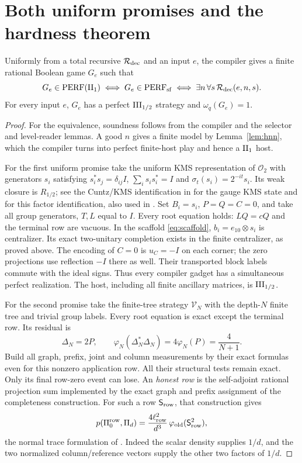 
\section{Both uniform promises and the hardness theorem}\label{sec:promises}
\begin{theoremC}
Uniformly from a total recursive $\mathcal R_{\rm dec}$ and an input $e$, the
compiler gives a finite rational Boolean game $G_e$ such that
\[
 G_e\in\mathrm{PERF}(\mathrm{II}_1)
 \iff G_e\in\mathrm{PERF}_{\mathrm{sf}}
 \iff \exists n\,\forall s\,\mathcal R_{\rm dec}(e,n,s).
\]
For every input $e$, $G_e$ has a perfect $\mathrm{III}_{1/2}$ strategy and
$\omega_q(G_e)=1$.
\end{theoremC}
\begin{proof}
For the equivalence, soundness follows from the compiler and the
selector and level-reader lemmas. A good $n$ gives a finite model
by Lemma~\ref{lem:hnn}, which the compiler turns into perfect finite-host
play and hence a $\mathrm{II}_1$ host.

For the first uniform promise take the uniform KMS representation
of $\mathcal O_2$ with generators $s_i$ satisfying
$s_i^*s_j=\delta_{ij}I$, $\sum_i s_is_i^*=I$ and
$\sigma_t(s_i)=2^{-it}s_i$.
Its weak closure is $R_{1/2}$; see the Cuntz/KMS identification in
\cite{OP} for the gauge KMS state and
\cite[Theorem 4.9 and Example 4.13]{Harris} for this factor
identification, also used in
\cite[Section 3.1]{ReadType}.
Set $B_i=s_i$, $P=Q=C=0$, and take all group generators, $T,L$ equal
to $I$. Every root equation holds: $LQ=cQ$ and the terminal row
are vacuous. In the scaffold \eqref{eq:scaffold},
$b_i=e_{10}\otimes s_i$ is centralizer.
Its exact two-unitary completion exists in the finite centralizer,
as proved above. The encoding of $C=0$ is $u_C=-I$ on each corner;
the zero projections use reflection $-I$ there as well.
Their transported block labels commute with the ideal signs.
Thus every compiler gadget has a simultaneous perfect realization.
The host, including all finite ancillary matrices, is
$\mathrm{III}_{1/2}$.

For the second promise take the finite-tree strategy $\mathcal V_N$
with the depth-$N$ finite tree and trivial group labels. Every root equation is exact except the terminal row.
Its residual is
\begin{equation}\label{eq:residual}
 \Delta_N=2P,\qquad
 \varphi_N(\Delta_N^*\Delta_N)=4\varphi_N(P)=\frac4{N+1}.
\end{equation}
Build all graph, prefix, joint and column measurements by their exact
formulas even for this nonzero application row. All their structural
tests remain exact. Only its final row-zero event can lose.
An \emph{honest row} is the self-adjoint rational projection sum
implemented by the exact graph and prefix assignment of the
completeness construction. For such a row $\mathsf S_{\rm row}$, that construction gives
\begin{equation}\label{eq:rowloss}
 p(\Pi_0^{\rm row},\Pi_d)=\frac{4\ell_{\rm row}^2}{d^3}\,\varphi_{\rm old}(\mathsf S_{\rm row}^2),
\end{equation}
the normal trace formulation of \cite[Eq.~(32)]{Entropy}.
Indeed the scalar density supplies $1/d$, and the two normalized
column/reference vectors supply the other two factors of $1/d$.


\end{proof}
